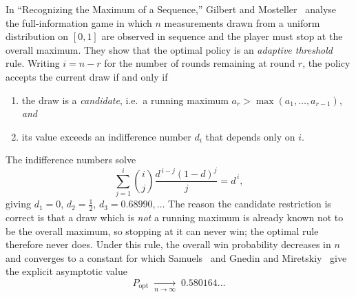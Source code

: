 \documentclass[11pt]{article}
\newcommand{\amax}{\operatorname{max}}
\begin{document}
In ``Recognizing the Maximum of a Sequence,'' Gilbert and Mosteller~\cite{GM1966}
analyse the full-information game in which $n$ measurements drawn from a uniform
distribution on $[0,1]$ are observed in sequence and the player must stop at the
overall maximum. They show that the optimal policy is an \emph{adaptive threshold}
rule. Writing $i = n-r$ for the number of rounds remaining at round $r$, the policy
accepts the current draw if and only if
\begin{enumerate}[label=(\roman*),nosep]
  \item the draw is a \emph{candidate}, i.e.\ a running maximum
        $a_r > \amax(a_1,\dots,a_{r-1})$, \emph{and}
  \item its value exceeds an indifference number $d_i$ that depends only on $i$.
\end{enumerate}
The indifference numbers solve
\begin{equation}\label{eq:indiff}
  \sum_{j=1}^{i}\binom{i}{j}\frac{d^{\,i-j}(1-d)^{j}}{j}=d^{\,i},
\end{equation}
giving $d_1=0$, $d_2=\tfrac12$, $d_3=0.68990,\dots$ The reason the candidate
restriction is correct is that a draw which is \emph{not} a running maximum is already
known not to be the overall maximum, so stopping at it can never win; the optimal rule
therefore never does. Under this rule, the overall win probability decreases in $n$
and converges to a constant for which Samuels~\cite{Samuels1982,Samuels1991} and
Gnedin and Miretskiy~\cite{GnedinMiretskiy2007} give the explicit asymptotic value
\begin{equation}\label{eq:opt}
  P_{\text{opt}} \;\xrightarrow[n\to\infty]{}\; 0.580164\ldots
\end{equation}
\end{document}
